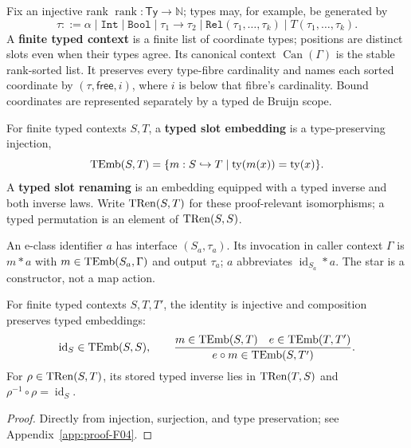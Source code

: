 \begin{definition}
\label{res:F02}
Fix an injective rank $\operatorname{rank}:\mathsf{Ty}\to\mathbb N$; types
may, for example, be generated by
\[
\tau::=\alpha\mid\texttt{Int}\mid\texttt{Bool}\mid\tau_1\to\tau_2
\mid\texttt{Rel}(\tau_1,\ldots,\tau_k)\mid T(\tau_1,\ldots,\tau_k).
\]
A \textbf{finite typed context} is a finite list of coordinate types;
positions are distinct slots even when their types agree.  Its canonical
context $\operatorname{Can}(\Gamma)$ is the stable rank-sorted list.  It
preserves every type-fibre cardinality and names each sorted coordinate by
$(\tau,\mathsf{free},i)$, where $i$ is below that fibre's cardinality.  Bound
coordinates are represented separately by a typed de Bruijn scope.
\end{definition}

\begin{definition}
\label{res:F03}
For finite typed contexts $S,T$, a \textbf{typed slot embedding} is a
type-preserving injection,
\[
\operatorname{TEmb}(S,T)=\{m:S\hookrightarrow T\mid
\operatorname{ty}(m(x))=\operatorname{ty}(x)\}.
\]
A \textbf{typed slot renaming} is an embedding equipped with a typed inverse
and both inverse laws.  Write $\operatorname{TRen}(S,T)$ for these proof-relevant
isomorphisms; a typed permutation is an element of $\operatorname{TRen}(S,S)$.
\end{definition}

An e-class identifier $a$ has interface $(S_a,\tau_a)$.  Its invocation in
caller context $\Gamma$ is $m*a$ with $m\in\operatorname{TEmb}(S_a,\Gamma)$ and output
$\tau_a$; $a$ abbreviates $\operatorname{id}_{S_a}*a$.  The star is a
constructor, not a map action.

\begin{proposition}
\label{res:F04}
For finite typed contexts $S,T,T'$, the identity is injective and composition
preserves typed embeddings:
\[
\operatorname{id}_S\in\operatorname{TEmb}(S,S),\qquad
\frac{m\in\operatorname{TEmb}(S,T)\quad e\in\operatorname{TEmb}(T,T')}{e\circ m\in\operatorname{TEmb}(S,T')}.
\]
For $\rho\in\operatorname{TRen}(S,T)$, its stored typed inverse lies in $\operatorname{TRen}(T,S)$ and
$\rho^{-1}\circ\rho=\operatorname{id}_S$.
\end{proposition}
\begin{proof}Directly from injection, surjection, and type preservation; see
Appendix~\ref{app:proof-F04}.\end{proof}

